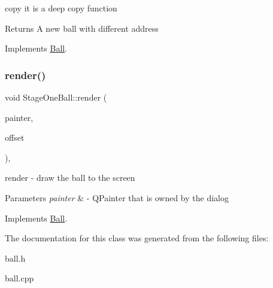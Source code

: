 copy it is a deep copy function 

\begin{DoxyReturn}{Returns}
A new ball with different address 
\end{DoxyReturn}


Implements \mbox{\hyperlink{class_ball_ae6c0731fabb7a45ba36df62a1975661a}{Ball}}.

\mbox{\label{class_stage_one_ball_aa4f7f52cb8946b59c201d724dc0dc5bd}} 
\subsubsection{\texorpdfstring{render()}{render()}}
{\footnotesize\ttfamily void Stage\+One\+Ball\+::render (\begin{DoxyParamCaption}\item[{Q\+Painter \&}]{painter,  }\item[{const Q\+Vector2D \&}]{offset }\end{DoxyParamCaption})\hspace{0.3cm}{\ttfamily [override]}, {\ttfamily [virtual]}}



render -\/ draw the ball to the screen 


\begin{DoxyParams}{Parameters}
{\em painter} & -\/ Q\+Painter that is owned by the dialog \\
\hline
\end{DoxyParams}


Implements \mbox{\hyperlink{class_ball_a307773aaa59aee90cef8767b0c22deca}{Ball}}.



The documentation for this class was generated from the following files\+:\begin{DoxyCompactItemize}
\item 
ball.\+h\item 
ball.\+cpp\end{DoxyCompactItemize}
